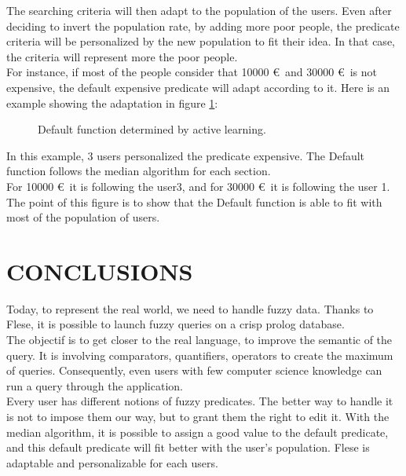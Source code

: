 \documentclass[a4paper,twoside]{article}
\begin{document}
The searching criteria will then adapt to the population of the users. Even after deciding to invert the population rate, by adding more poor people, the predicate criteria will be personalized by the new population to fit their idea. In that case, the criteria will represent more the poor people. \\

For instance, if most of the people consider that 10000 \euro\  and 30000 \euro\  is not expensive, the default expensive predicate will adapt according to it. Here is an example showing the adaptation in figure \ref{fig:activelearning}:


\begin{figure}[H]
  \centering
   {}
  \caption{Default function determined by active learning.}
  \label{fig:activelearning}
 \end{figure}

In this example, 3 users personalized the predicate expensive. The Default function follows the median algorithm for each section. \\

For 10000 \euro\, it is following the user3, and for 30000 \euro\, it is following the user 1. The point of this figure is to show that the Default function is able to fit with most of the population of users.

\newpage

\section{\uppercase{Conclusions}}
\label{sec:conclusion}

Today, to represent the real world, we need to handle fuzzy data. Thanks to Flese, it is possible to launch fuzzy queries on a crisp prolog database. \\

The objectif is to get closer to the real language, to improve the semantic of the query. It is involving comparators, quantifiers, operators to create the maximum of queries. Consequently, even users with few computer science knowledge can run a query through the application. \\

Every user has different notions of fuzzy predicates. The better way to handle it is not to impose them our way, but to grant them the right to edit it. With the median algorithm, it is possible to assign a good value to the default predicate, and this default predicate will fit better with the user's population. Flese is adaptable and personalizable for each users.
\end{document}
